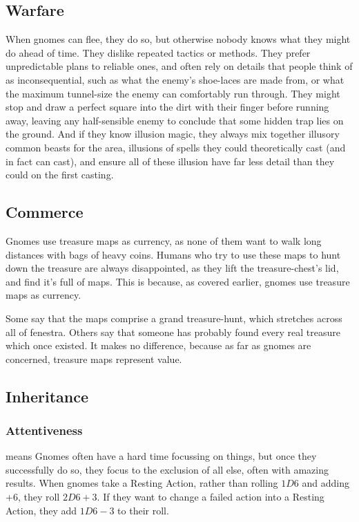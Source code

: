 \begin{multicols}{2}
\subsection{Warfare}

When gnomes can flee, they do so, but otherwise nobody knows what they might do ahead of time.
They dislike repeated tactics or methods.
They prefer unpredictable plans to reliable ones, and often rely on details that people think of as inconsequential, such as what the enemy's shoe-laces are made from, or what the maximum tunnel-size the enemy can comfortably run through.
They might stop and draw a perfect square into the dirt with their finger before running away, leaving any half-sensible enemy to conclude that some hidden trap lies on the ground.
And if they know illusion magic, they always mix together illusory common beasts for the area, illusions of spells they could theoretically cast (and in fact can cast), and ensure all of these illusion have far less detail than they could on the first casting.

\subsection{Commerce}

Gnomes use treasure maps as currency, as none of them want to walk long distances with bags of heavy coins.
Humans who try to use these maps to hunt down the treasure are always disappointed, as they lift the treasure-chest's lid, and find it's full of maps.
This is because, as covered earlier, gnomes use treasure maps as currency.

Some say that the maps comprise a grand treasure-hunt, which stretches across all of \gls{fenestra}.
Others say that someone has probably found every real treasure which once existed.
It makes no difference, because as far as gnomes are concerned, treasure maps represent value.

\subsection{Inheritance}

\subsubsection[Attentiveness: roll 2D6+3 for resting actions]{Attentiveness}
\label{gnomishInheritance}
means Gnomes often have a hard time focussing on things, but once they successfully do so, they focus to the exclusion of all else, often with amazing results.
When gnomes take a Resting Action, rather than rolling $1D6$ and adding +6, they roll $2D6+3$.
If they want to change a failed action into a Resting Action, they add $1D6-3$ to their roll.


\end{multicols}
